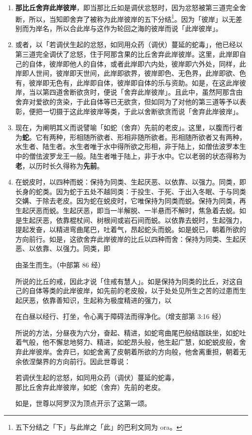 \begin{enumerate}
\item \textbf{那比丘舍弃此岸彼岸}，即当那比丘如是调伏忿怒时，因为忿怒被第三道完全舍断，所以，当知即舍弃了被称为此岸彼岸的五下分结\footnote{五下分结之「下」与此岸之「此」的巴利文同为 ora。}。因为「彼岸」以无差别而为岸名，所以合此岸与这作为轮回之海的彼岸而说「此岸彼岸」。
\item 或者，以「若调伏生起的忿怒，如同用众药（调伏）蔓延的蛇毒」，他已经以第三道完全调伏了忿怒，住于阿那含果的比丘舍弃此岸彼岸。这里，此岸即自己的自体，彼岸即他人的自体，或者此岸即六内处，彼岸即六外处，同样，此岸即人世间，彼岸即天世间，此岸即欲界，彼岸即色、无色界，此岸即欲、色有，彼岸即无色有，此岸即自体，彼岸即自体的乐与资助。如是，在这此岸彼岸，当以第四道舍断欲贪时，便说「舍弃此岸彼岸」。且此中，虽然阿那含由舍弃对爱欲的贪染，于此自体等已无欲贪，但如同为了对他的第三道等予以表彰，便把一切摄于这此岸彼岸等类，于此以舍断欲贪而说「舍弃此岸彼岸」。
\item 现在，为阐明其义而说譬喻「如蛇（舍弃）先前的老皮」。这里，以腹而行者为\textbf{蛇}。它有两种，形相随所欲者、形相非随所欲者。形相随所欲者又有两种，水生者、陆生者。水生者唯于水中得所欲之形相，非于陆上，如僧佉波罗本生中的僧佉波罗龙王一般。陆生者唯于陆上，非于水中。它以老弱的状态得称为\textbf{老}，以历时长久得称为\textbf{先前}。
\item 在蜕皮时，以四种而蜕：保持为同类、生起厌恶、以依靠、以强力。同类，即长身的蛇类。因为蛇于五处不越同类：于投生、于死、于出入冬眠、于与同类交媾、于除去老皮。因为蛇在蜕皮时，它唯保持为同类而蜕。保持为同类，再生起厌恶而蜕。生起厌恶，即当一半解脱、一半悬而不解时，焦急着去蜕。如是生起厌恶，依靠棍杖间、树根间或岩石间而蜕。以依靠去蜕时，生起强力，提起发奋，以精进弯曲尾巴，吐着气，昂起蛇头而蜕。如是蜕已，朝着所欲的方向前行。如是，这欲舍弃此岸彼岸的比丘以四种而舍：保持为同类、生起厌恶、以依靠、以强力。同类，即\begin{quoting}由圣生而生。（中部第 86 经）\end{quoting}所说的比丘的戒，因此才说「住戒有慧人」。如是保持为同类的比丘，对这自己的自体等类的此岸彼岸，如先前的老皮般，以于处处见所生之苦的过患而生起厌恶，依靠善知识，生起称为极度精进的强力，以\begin{quoting}在白昼以经行、打坐，令心离于障碍法而得净化。（增支部第 3:16 经）\end{quoting}所说的方法，分昼夜为六分，奋起、精进，如蛇弯曲尾巴般结跏趺坐，如蛇吐着气般，他不懈怠地努力、精进，如蛇昂头般，他生起广慧，如蛇蜕皮般，舍弃此岸彼岸。舍弃已，如蛇舍离了皮朝着所欲的方向般，他舍离重担，朝着无余依涅槃界的方向前行。因此世尊说：\begin{quoting}若调伏生起的忿怒，如同用众药（调伏）蔓延的蛇毒，\\那比丘舍弃此岸彼岸，如蛇（舍弃）先前的老皮。\end{quoting}如是，世尊以阿罗汉为顶点开示了这第一颂。\end{enumerate}

